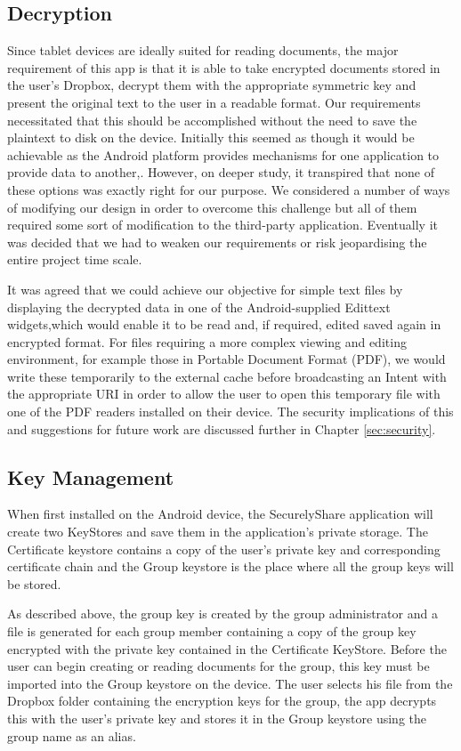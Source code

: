 \subsection*{Decryption }
Since tablet devices are ideally suited for reading documents, the major requirement of this app is that it is able to take encrypted documents stored in the user's Dropbox,  decrypt them with the appropriate symmetric key and present the original text to the user in a readable format.  Our requirements necessitated that this should be accomplished without the need to save the plaintext to disk on the device.  Initially this seemed as though it would be achievable as the Android platform provides mechanisms for one application to provide data to another,.  However, on deeper study, it transpired that none of these options was exactly right for our purpose.  We considered a number of ways of modifying our design in order to overcome this challenge  but all of them required some sort of modification to the third-party application.  Eventually it was decided that we had to weaken our requirements or risk jeopardising the entire project time scale. 

It was agreed that we could achieve our objective for simple text files by displaying the decrypted data in one of the Android-supplied Edittext widgets,which would enable it to be read and, if required, edited saved again in encrypted format.  For files requiring a more complex viewing and editing environment, for example those in Portable Document Format (PDF), we would write these temporarily to the external cache before broadcasting an Intent with the appropriate URI in order to allow the user to open this temporary file with one of the PDF readers installed on their device.  The security implications of this and suggestions for future work are discussed further in Chapter \ref{sec:security}.


\subsection*{Key Management }
When first installed on the Android device, the SecurelyShare application will create two KeyStores and save them in the application's private storage.  The Certificate keystore contains a copy of the user's private key and corresponding certificate chain and the Group keystore is the place where all the group keys will be stored.  

As described above, the group key is created by the group administrator and a file is generated for each group member containing a copy of the group key encrypted with the private key contained in the Certificate KeyStore.  Before the user can begin creating or reading documents for the group, this key must be imported into the Group keystore on the device.  The user selects his file from the Dropbox folder containing the encryption keys for the group, the app decrypts this with the user's private key and stores it in the Group keystore using the group name as an alias.  





